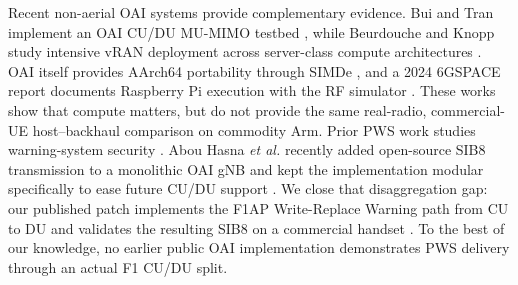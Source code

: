 \documentclass[conference]{IEEEtran}
\begin{document}
Recent non-aerial OAI systems provide complementary evidence. Bui and Tran
implement an OAI CU/DU MU-MIMO testbed \cite{bui2025}, while Beurdouche and
Knopp study intensive vRAN deployment across server-class compute
architectures \cite{beurdouche2026}. OAI itself provides AArch64 portability
through SIMDe \cite{oaiarmrelease}, and a 2024 6GSPACE report documents
Raspberry Pi execution with the RF simulator \cite{oaiarmpi2024}. These works
show that compute matters, but do not provide the same real-radio,
commercial-UE host--backhaul comparison on commodity Arm. Prior PWS work
studies warning-system security \cite{bitsikas2022}. Abou Hasna \emph{et al.}
recently added open-source SIB8 transmission to a monolithic OAI gNB and kept
the implementation modular specifically to ease future CU/DU support
\cite{abouhasna2026}. We close that disaggregation gap: our published patch
implements the F1AP Write-Replace Warning path from CU to DU and validates the
resulting SIB8 on a commercial handset \cite{pwspatch}. To the best of our
knowledge, no earlier public OAI implementation demonstrates PWS delivery
through an actual F1 CU/DU split.
\end{document}
